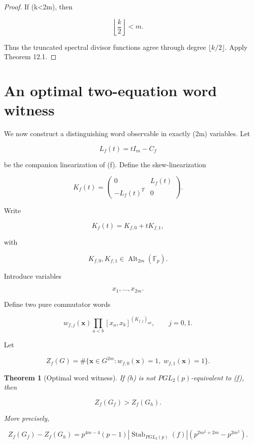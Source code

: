 \documentclass[11pt]{article}
\newtheorem{theorem}{Theorem}[section]
\begin{document}
\begin{proof}
If (k<2m), then

\[
\left\lfloor\frac k2\right\rfloor<m.
\]

Thus the truncated spectral divisor functions agree through degree $\lfloor k/2\rfloor$. Apply Theorem 12.1.

\end{proof}

\section{An optimal two-equation word witness}

We now construct a distinguishing word observable in exactly (2m) variables. Let

\[
L_f(t)=tI_m-C_f
\]

be the companion linearization of (f). Define the skew-linearization

\[
K_f(t)=
\begin{pmatrix}
0 & L_f(t)\\
-L_f(t)^T & 0
\end{pmatrix}.
\tag{15.1}
\]

Write

\[
K_f(t)=K_{f,0}+tK_{f,1},
\]

with

\[
K_{f,0},K_{f,1}\in\operatorname{Alt}_{2m}(\mathbb F_p).
\]

Introduce variables

\[
x_1,\ldots,x_{2m}.
\]

Define two pure commutator words

\[
w_{f,j}(\mathbf x)
\prod_{a<b}
[x_a,x_b]^{(K_{f,j})_{ab}},
\qquad
j=0,1.
\tag{15.2}
\]

Let

\[
Z_f(G)
=\#\{\mathbf x\in G^{2m}: w_{f,0}(\mathbf x)=1,\; w_{f,1}(\mathbf x)=1\}.
\]

\begin{theorem}[Optimal word witness]
If (h) is not $PGL_2(p)$-equivalent to (f), then

\[
Z_f(G_f)>Z_f(G_h).
\]

More precisely,

\[
Z_f(G_f)-Z_f(G_h)
=p^{4m-4}
(p-1)
|\operatorname{Stab}_{PGL_2(p)}(f)|
\left(
p^{2m^2+2m}-p^{2m^2}
\right).
\tag{15.3}
\]

\end{theorem}
\end{document}
